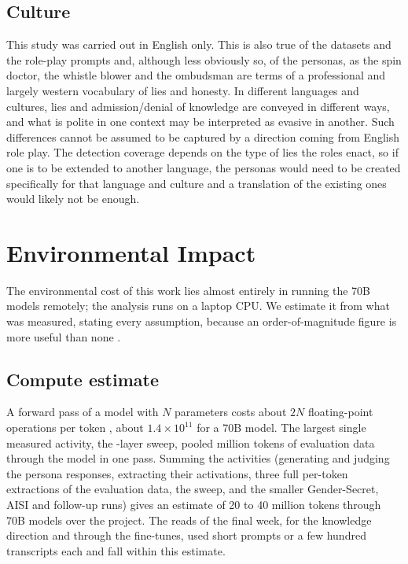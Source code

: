 \subsection{Culture}

This study was carried out in English only. This is also true of the datasets and the role-play
prompts and, although less obviously so, of the personas, as the spin doctor, the whistle blower
and the ombudsman are terms of a professional and largely western vocabulary of lies and
honesty. In different languages and cultures, lies and admission/denial of knowledge are
conveyed in different ways, and what is polite in one context may be interpreted as evasive in
another. Such differences cannot be assumed to be captured by a direction coming from English
role play. The detection coverage depends on the type of lies the roles enact, so if one is to be
extended to another language, the personas would need to be created specifically for that
language and culture and a translation of the existing ones would likely not be enough.

\section{Environmental Impact}
\label{sec:environment}

The environmental cost of this work lies almost entirely in running the 70B models remotely; the
analysis runs on a laptop CPU. We estimate it from what was measured, stating every assumption,
because an order-of-magnitude figure is more useful than none \cite{strubell2019energy,patterson2021carbon}.

\subsection{Compute estimate}

A forward pass of a model with $N$ parameters costs about $2N$ floating-point operations per token
\cite{kaplan2020scaling}, about $1.4 \times 10^{11}$ for a 70B model. The largest single measured
activity, the -layer sweep, pooled  million tokens of evaluation data
through the model in one pass. Summing the activities (generating and judging the
 persona responses, extracting their activations, three full per-token extractions
of the evaluation data, the sweep, and the smaller Gender-Secret, AISI and follow-up runs) gives an
estimate of 20 to 40 million tokens through 70B models over the project. The reads of the final week,
for the knowledge direction and through the fine-tunes, used short prompts or a few hundred
transcripts each and fall within this estimate.

